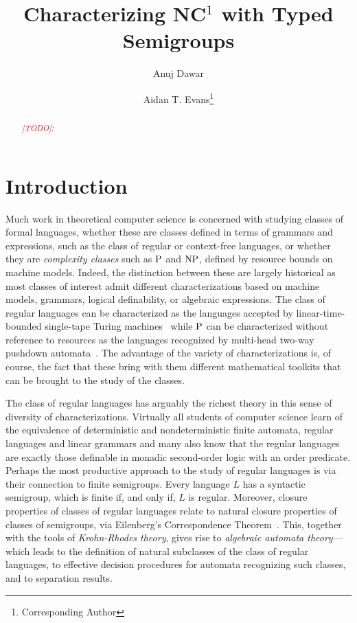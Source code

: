 \documentclass[a4paper,UKenglish,cleveref, autoref, thm-restate, anonymous]{lipics-v2021}
\title{Characterizing NC${}^1$ with Typed Semigroups} %
\author{Anuj Dawar}{Department of Computer Science and Technology, University of Cambridge, United Kingdom \and \url{https://www.cl.cam.ac.uk/~ad260/} }{anuj.dawar@cl.cam.ac.uk}{https://orcid.org/0000-0003-4014-8248}{(Optional) author-specific funding acknowledgements}%
\author{Aidan T. Evans\footnote{Corresponding Author}}{Department of Computer Science and Technology, University of Cambridge, United Kingdom \and \url{https://www.aidantevans.com/} }{ate26@cam.ac.uk}{https://orcid.org/0009-0007-9084-3608}{[funding]}
\newcommand{\todo}[1]{\textit{\textcolor{red}{[TODO]: #1}}}
\begin{document}


\maketitle

\begin{abstract}
    \todo{}
\end{abstract}

\newpage

\section{Introduction}


Much work in theoretical computer science is concerned with studying classes of formal languages, whether these are classes defined in terms of grammars and expressions, such as the class of regular or context-free languages, or whether they are \emph{complexity classes} such as $\mathrm{P}$ and $\mathrm{NP}$, defined by resource bounds on machine models.  Indeed, the distinction between these are largely historical as most classes of interest admit different characterizations based on machine models, grammars, logical definability, or algebraic expressions. The class of regular languages can be characterized as the languages accepted by linear-time-bounded single-tape Turing machines~\cite{hennie1965one} while $\mathrm{P}$ can be characterized without reference to resources as the languages recognized by multi-head two-way pushdown automata~\cite{cook1971characterizations}.  The advantage of the variety of characterizations is, of course, the fact that these bring with them different mathematical toolkits that can be brought to the study of the classes.

The class of regular languages has arguably the richest theory in this sense of diversity of characterizations.  Virtually all students of computer science learn of the equivalence of deterministic and nondeterministic finite automata, regular languages and linear grammars and many also know that the regular languages are exactly those definable in monadic second-order logic with an order predicate.  Perhaps the most productive approach to the study of regular languages is via their connection to finite semigroups.  Every language $L$ has a syntactic semigroup, which is finite if, and only if, $L$ is regular.  Moreover, closure properties of classes of regular languages relate to natural closure properties of classes of semigroups, via Eilenberg's Correspondence Theorem~\cite{eilenberg1976automata}.  This, together with the tools of  \emph{Krohn-Rhodes theory}, gives rise to \emph{algebraic automata theory}---which leads to the definition of natural subclasses of the class of regular languages, to effective decision procedures for automata recognizing such classes, and to separation results.
\end{document}
